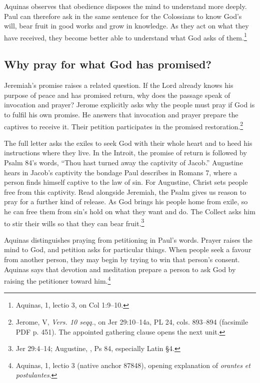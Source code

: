 Aquinas observes that obedience disposes the mind to understand
more deeply. Paul can therefore ask in the same sentence for the
Colossians to know God's will, bear fruit in good works and grow in
knowledge. As they act on what they have received, they become
better able to understand what God asks of them.\footnote{Aquinas,
 1, lectio 3, on Col 1:9--10.}

\subsection{Why pray for what God has promised?}

Jeremiah's promise raises a related question. If the Lord
already knows his purpose of peace and has promised return,
why does the passage speak of invocation and prayer?
Jerome explicitly asks why the people must pray if God is
to fulfil his own promise. He answers that invocation
and prayer prepare the captives to receive it. Their
petition participates in the promised restoration.\footnote{Jerome,
 V, \textit{Vers. 10 seqq.}, on
Jer 29:10--14a, PL 24, cols. 893--894 (facsimile PDF p. 451).
The appointed gathering clause opens the next unit.}

The full letter asks the exiles to seek God with their whole
heart and to heed his instructions where they live. In the Introit,
the promise of return is followed by Psalm 84's words, ``Thou
hast turned away the captivity of Jacob.'' Augustine hears in
Jacob's captivity the bondage Paul describes in Romans 7, where
a person finds himself captive to the law of sin. For Augustine,
Christ sets people free from this captivity. Read alongside
Jeremiah, the Psalm gives us reason to pray for a further kind
of release. As God brings his people home from exile, so he can
free them from sin's hold on what they want and do. The Collect asks
him to stir their wills so that they can bear fruit.\footnote{Jer
29:4--14; Augustine, , Ps 84,
especially Latin §4.}

Aquinas distinguishes praying from petitioning in Paul's words.
Prayer raises the mind to God, and petition asks for particular
things. When people seek a favour from another person, they may
begin by trying to win that person's consent. Aquinas says that
devotion and meditation prepare a person to ask God by raising
the petitioner toward him.\footnote{Aquinas,
 1, lectio 3 (native anchor 87848),
opening explanation of \textit{orantes et postulantes}.}

